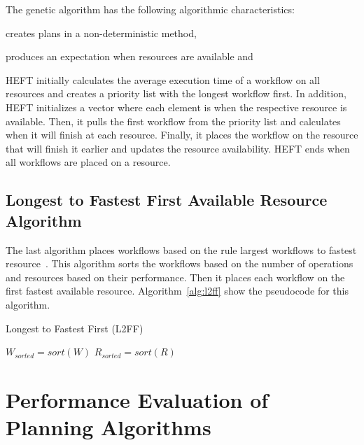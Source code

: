 The genetic algorithm has the following algorithmic characteristics:
\begin{inparaenum}[1)]
    \item creates plans in a non-deterministic method,
    \item produces an expectation when resources are available and
\end{inparaenum}

HEFT initially calculates the average execution time of a workflow on all resources and creates a priority list with the longest workflow first.
In addition, HEFT initializes a vector where each element is when the respective resource is available.
Then, it pulls the first workflow from the priority list and calculates when it will finish at each resource.
Finally, it places the workflow on the resource that will finish it earlier and updates the resource availability.
HEFT ends when all workflows are placed on a resource.

\subsection{Longest to Fastest First Available Resource Algorithm}
\label{algo:l2ff}
The last algorithm places workflows based on the rule largest workflows to fastest resource~\cite{balasubramanian2019programming}.
This algorithm sorts the workflows based on the number of operations and resources based on their performance.
Then it places each workflow on the first fastest available resource.
Algorithm~\ref{alg:l2ff} show the pseudocode for this algorithm.

\begin{algorithm}[ht]
    \caption{Longest to Fastest First (L2FF)}
    \label{alg:l2ff}
    \begin{algorithmic}[1]
        \State \texttt{$W_{sorted}=sort(W)$} 
        \State \texttt{$R_{sorted}=sort(R)$}
        \EndFor
        \EndProcedure
    \end{algorithmic}
\end{algorithm}

\section{Performance Evaluation of Planning Algorithms}
\label{sec:algo_perf_comp}

